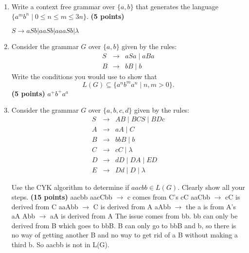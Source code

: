\documentclass{article}
\begin{document}
\begin{enumerate}
\item Write a context free grammar over $\{a, b\}$ that generates the
  language $\{ a^mb^n \mid 0 \leq n \leq m \leq 3n
  \}$. \hfill{\textbf{(5 points)}}
  
  \newline $S \rightarrow aSb|aaSb|aaaSb| \lambda$

\item Consider the grammar $G$ over $\{ a, b \}$ given by the rules:
  \begin{eqnarray*}
    S &\rightarrow& aSa \mid aBa\\
    B &\rightarrow& bB \mid b
  \end{eqnarray*}
  Write the conditions
  you would use to show that
  \[
  L(G) \subseteq \{ a^nb^ma^n \mid n, m > 0
  \}.
  \]
  \hfill{\textbf{(5 points)}}
  \newline $a^+b^+a^a$

\item Consider the grammar $G$ over $\{ a, b, c, d \}$ given by the rules:
  \begin{eqnarray*}
    S &\rightarrow& AB \mid BCS \mid BDc \\
    A &\rightarrow& aA \mid C \\
    B &\rightarrow& bbB \mid b \\
    C &\rightarrow& cC \mid \lambda \\
    D &\rightarrow& dD \mid DA \mid ED \\
    E &\rightarrow& Dd \mid D \mid \lambda
  \end{eqnarray*}

  Use the CYK algorithm to determine if $aacbb \in L(G)$. Clearly show
  all your steps. \hfill{\textbf{(15 points)}}
  \newline aacbb 
  \newline aacCbb $\rightarrow$ c comes from C's cC
  \newline aaCbb $\rightarrow$ cC is derived from C
  \newline aaAbb $\rightarrow$ C is derived from A
  \newline aAbb $\rightarrow$ the a is from A's aA
  \newline Abb $\rightarrow$ aA is derived from A
  \newline The issue comes from bb. bb can only be derived from B which goes to bbB. B can only go to bbB and b, so there is no way of getting another B and no way to get rid of a B without making a third b. So aacbb is not in L(G).
\end{enumerate}
\end{document}
